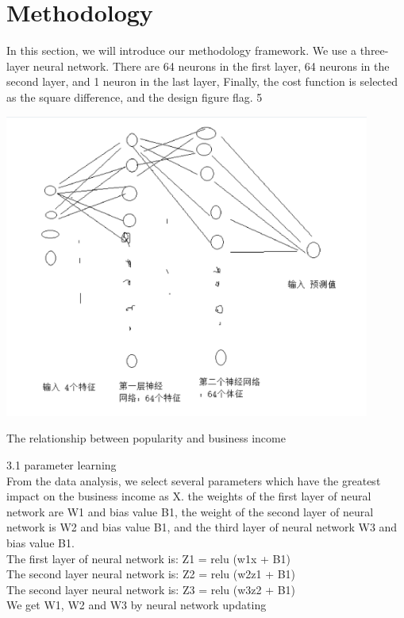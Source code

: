\section{Methodology} 


In this section, we will introduce our methodology framework. We use a three-layer neural network. There are 64 neurons in the first layer, 64 neurons in the second layer, and 1 neuron in the last layer,            Finally, the cost function is selected as the square difference, and the design figure flag. 5
\begin{center}

  \begin{minipage}{0.3\linewidth}
  \centering

  \includegraphics[width=0.9\textwidth]{logos/7.eps}
  
  {\small{The relationship between popularity and business income}}

  \end{minipage}
\end{center}


3.1 parameter learning \\
From the data analysis, we select several parameters which have the greatest impact on the business income as X. the weights of the first layer of neural network are W1 and bias value B1, the weight of the second layer of neural network is W2 and bias value B1, and the third layer of neural network W3 and bias value B1.\\ 
The first layer of neural network is: Z1 = relu (w1x + B1) \\
The second layer neural network is: Z2 = relu (w2z1 + B1) \\
The second layer neural network is: Z3 = relu (w3z2 + B1) \\
We get W1, W2 and W3 by neural network updating

